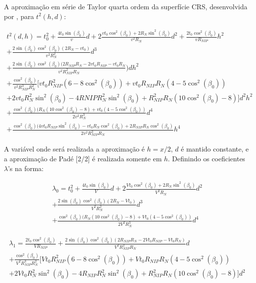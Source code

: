 A aproximação em série de Taylor quarta ordem da superfície CRS, desenvolvida por \cite{germam}, para $t^2(h,d)$:


\begin{multline}
\label{eq:6.23}
 t^2(d,h)=t_0^2+\frac{4t_0\sin(\beta_0)}{v}d+2\frac{vt_0\cos^2(\beta_0)+2R_N\sin^2(\beta_0)}{v^2R_N}d^2+\frac{2t_0\cos^2(\beta_0)}{vR_{NIP}}h^2 \\
+\frac{2\sin(\beta_0)\cos^2(\beta_0)(2R_N-vt_0)}{v^2R_N^2}d^3 \\
+\frac{2\sin(\beta_0)\cos^2(\beta_0)(2R_{NIP}R_N-2vt_0R_{NIP}-vt_0R_N}{v^2R_{NIP}^2R_N})dh^2 \\
+\frac{\cos^2(\beta_0)}{v^2R_{NIP}^3R_N^2}[vt_0R_{NIP}^2(6-8\cos^2(\beta_0))+vt_0R_{NIP}R_N(4-5\cos^2(\beta_0)) \\
+2vt_0R_N^2\sin^2(\beta_0)-4R{NIP}R_N^2\sin^2(\beta_0)+R_{NIP}^2R_N(10\cos^2(\beta_0)-8)]d^2h^2 \\ 
+\frac{\cos^2(\beta_0)(R_N(10\cos^2(\beta_0)-8)+vt_0(4-5\cos^2(\beta_0))}{2v^2R_N^3}d^4 \\
+\frac{\cos^2(\beta_0)(4vt_0R_{NIP}\sin^2(\beta_0)-vt_0R_N\cos^2(\beta_0)+2R_{NIP}R_N\cos^2(\beta_0)}{2v^2R_{NIP}^3R_N}h^4
\end{multline}

A variável onde será realizada a aproximação é $h=x/2$,
$d$ é mantido constante, e a aproximação de Padé [2/2] é realizada somente em $h$.
Definindo os coeficientes $\lambda$'s na forma:

\begin{multline}
\label{eq:6.24}
 \lambda_0=t_0^2+\frac{4t_0\sin(\beta_0)}{V}d+2\frac{Vt_0\cos^2(\beta_0)+2R_N\sin^2(\beta_0)}{V^2R_N}d^2 \\
+\frac{2\sin(\beta_0)\cos^2(\beta_0)(2R_N-Vt_0)}{V^2R_N^2}d^3 \\
+\frac{\cos^2(\beta_0)(R_N(10\cos^2(\beta_0)-8)+Vt_0(4-5\cos^2(\beta_0))}{2V^2R_N^3}d^4 
 \end{multline}
 
\begin{multline}
\label{eq:6.25}
 \lambda_1=\frac{2t_0\cos^2(\beta_0)}{VR_{NIP}}+\frac{2\sin(\beta_0)\cos^2(\beta_0)(2R_{NIP}R_N-2Vt_0R_{NIP}-Vt_0R_N)}{V^2R_{NIP}^2R_N}d \\
+\frac{\cos^2(\beta_0)}{V^2R_{NIP}^3R_N^2}[Vt_0R_{NIP}^2(6-8\cos^2(\beta_0))+Vt_0R_{NIP}R_N(4-5\cos^2(\beta_0)) \\
+2Vt_0R_N^2\sin^2(\beta_0)-4R_{NIP}R_N^2\sin^2(\beta_0)+R_{NIP}^2R_N(10\cos^2(\beta_0)-8)]d^2
\end{multline}

